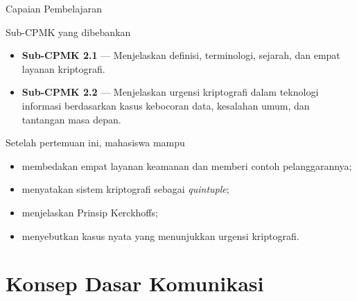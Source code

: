\documentclass[aspectratio=169,11pt]{beamer}
\begin{document}
\begin{frame}{Capaian Pembelajaran}
    \begin{block}{Sub-CPMK yang dibebankan}
        \begin{itemize}
            \item \textbf{Sub-CPMK 2.1} --- Menjelaskan definisi, terminologi,
                  sejarah, dan empat layanan kriptografi.
            \item \textbf{Sub-CPMK 2.2} --- Menjelaskan urgensi kriptografi
                  dalam teknologi informasi berdasarkan kasus kebocoran data,
                  kesalahan umum, dan tantangan masa depan.
        \end{itemize}
    \end{block}
    \vspace{0.3cm}
    \begin{exampleblock}{Setelah pertemuan ini, mahasiswa mampu}
        \begin{itemize}
            \item membedakan empat layanan keamanan dan memberi contoh pelanggarannya;
            \item menyatakan sistem kriptografi sebagai \textit{quintuple};
            \item menjelaskan Prinsip Kerckhoffs;
            \item menyebutkan kasus nyata yang menunjukkan urgensi kriptografi.
        \end{itemize}
    \end{exampleblock}
\end{frame}

\section{Konsep Dasar Komunikasi}
\end{document}
